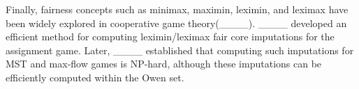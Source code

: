 Finally, fairness concepts such as minimax, maximin, leximin, and leximax have been widely explored in cooperative game theory(____). ____ developed an efficient method for computing leximin/leximax fair core imputations for the assignment game. Later, ____ established that computing such imputations for MST and max-flow games is NP-hard, although these imputations can be efficiently computed within the Owen set.


